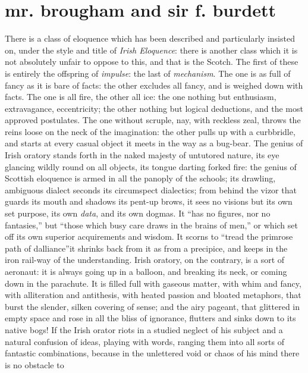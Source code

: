 \chapter[Mr. Brougham and Sir F. Burdett]
{mr. brougham {\normalsize and} sir f. burdett}

There is a class of eloquence which has been described and
particularly insisted on, under the style and title of \emph{Irish
  Eloquence}: there is another class which it is not absolutely
unfair to oppose to this, and that is the Scotch. The first of
these is entirely the offspring of \emph{impulse}: the last of
\emph{mechanism}. The one is as full of fancy as it is bare of
facts: the other excludes all fancy, and is weighed down with
facts. The one is all fire, the other all ice: the one nothing but
enthusiasm, extravagance, eccentricity; the other nothing but
logical deductions, and the most approved postulates. The one
without scruple, nay, with reckless zeal, throws the reins loose
on the neck of the imagination: the other pulls up with a
curbbridle, and starts at every casual object it meets in the way
as a bug-bear. The genius of Irish oratory stands forth in the
naked majesty of untutored nature, its eye glancing wildly round
on all objects, its tongue darting forked fire: the genius of
Scottish eloquence is armed in all the panoply of the schools; its
drawling, ambiguous dialect seconds its circumspect dialectics;
from behind the vizor that guards its mouth and shadows its
pent-up brows, it sees no visions but its own set purpose, its own
\emph{data}, and its own dogmas. It ``has no figures, nor no
fantasies,'' but ``those which busy care draws in the brains of
men,'' or which set off its own superior acquirements and
wisdom. It scorns to ``tread the primrose path of
dalliance''\textemdash it shrinks back from it as from a precipice,
and keeps in the iron rail-way of the understanding. Irish
oratory, on the contrary, is a sort of aeronaut: it is always
going up in a balloon, and breaking its neck, or coming down in
the parachute. It is filled full with gaseous matter, with whim
and fancy, with alliteration and antithesis, with heated passion
and bloated metaphors, that burst the slender, silken covering of
sense; and the airy pageant, that glittered in empty space and
rose in all the bliss of ignorance, flutters and sinks down to its
native bogs! If the Irish orator riots in a studied neglect of his
subject and a natural confusion of ideas, playing with words,
ranging them into all sorts of fantastic combinations, because in
the unlettered void or chaos of his mind there is no obstacle to
